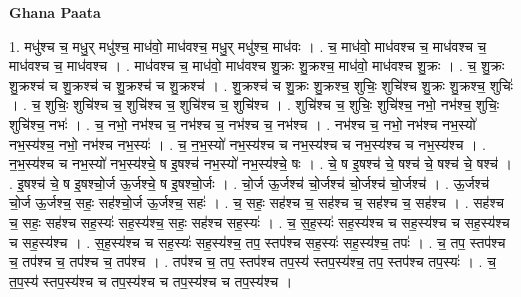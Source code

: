 \documentclass[17pt]{extarticle}
\begin{document}
\textbf{Ghana Paata } \newline

1. मधु॑श्च च॒ मधु॒र् मधु॑श्च॒ माध॑वो॒ माध॑वश्च॒ मधु॒र् मधु॑श्च॒ माध॑वः । . च॒ माध॑वो॒ माध॑वश्च च॒ माध॑वश्च च॒ माध॑वश्च च॒ माध॑वश्च । . माध॑वश्च च॒ माध॑वो॒ माध॑वश्च शु॒क्रः शु॒क्रश्च॒ माध॑वो॒ माध॑वश्च शु॒क्रः । . च॒ शु॒क्रः शु॒क्रश्च॑ च शु॒क्रश्च॑ च शु॒क्रश्च॑ च शु॒क्रश्च॑ । . शु॒क्रश्च॑ च शु॒क्रः शु॒क्रश्च॒ शुचिः॒ शुचि॑श्च शु॒क्रः शु॒क्रश्च॒ शुचिः॑ । . च॒ शुचिः॒ शुचि॑श्च च॒ शुचि॑श्च च॒ शुचि॑श्च च॒ शुचि॑श्च । . शुचि॑श्च च॒ शुचिः॒ शुचि॑श्च॒ नभो॒ नभ॑श्च॒ शुचिः॒ शुचि॑श्च॒ नभः॑ । . च॒ नभो॒ नभ॑श्च च॒ नभ॑श्च च॒ नभ॑श्च च॒ नभ॑श्च । . नभ॑श्च च॒ नभो॒ नभ॑श्च नभ॒स्यो॑ नभ॒स्य॑श्च॒ नभो॒ नभ॑श्च नभ॒स्यः॑ । . च॒ न॒भ॒स्यो॑ नभ॒स्य॑श्च च नभ॒स्य॑श्च च नभ॒स्य॑श्च च नभ॒स्य॑श्च । . न॒भ॒स्य॑श्च च नभ॒स्यो॑ नभ॒स्य॑श्चे॒ ष इ॒षश्च॑ नभ॒स्यो॑ नभ॒स्य॑श्चे॒ षः । . चे॒ ष इ॒षश्च॑ चे॒ षश्च॑ चे॒ षश्च॑ चे॒ षश्च॑ । . इ॒षश्च॑ चे॒ ष इ॒षश्चो॒र्ज ऊ॒र्जश्चे॒ ष इ॒षश्चो॒र्जः । . चो॒र्ज ऊ॒र्जश्च॑ चो॒र्जश्च॑ चो॒र्जश्च॑ चो॒र्जश्च॑ । . ऊ॒र्जश्च॑ चो॒र्ज ऊ॒र्जश्च॒ सहः॒ सह॑श्चो॒र्ज ऊ॒र्जश्च॒ सहः॑ । . च॒ सहः॒ सह॑श्च च॒ सह॑श्च च॒ सह॑श्च च॒ सह॑श्च । . सह॑श्च च॒ सहः॒ सह॑श्च सह॒स्यः॑ सह॒स्य॑श्च॒ सहः॒ सह॑श्च सह॒स्यः॑ । . च॒ स॒ह॒स्यः॑ सह॒स्य॑श्च च सह॒स्य॑श्च च सह॒स्य॑श्च च सह॒स्य॑श्च । . स॒ह॒स्य॑श्च च सह॒स्यः॑ सह॒स्य॑श्च॒ तप॒ स्तप॑श्च सह॒स्यः॑ सह॒स्य॑श्च॒ तपः॑ । . च॒ तप॒ स्तप॑श्च च॒ तप॑श्च च॒ तप॑श्च च॒ तप॑श्च । . तप॑श्च च॒ तप॒ स्तप॑श्च तप॒स्य॑ स्तप॒स्य॑श्च॒ तप॒ स्तप॑श्च तप॒स्यः॑ । . च॒ त॒प॒स्य॑ स्तप॒स्य॑श्च च तप॒स्य॑श्च च तप॒स्य॑श्च च तप॒स्य॑श्च । \newline
\end{document}
